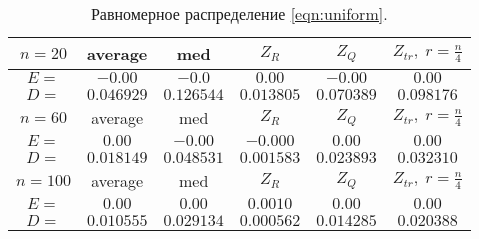 \documentclass[a4]{article}
\begin{document}
\begin{table}[H]
\caption{\label{tab:uniform} Равномерное распределение \eqref{eqn:uniform}.}
\begin{center}
\begin{tabular}{|c|c|c|c|c|c|}
\hline
$n = 20$  & average & med & $Z_R$ & $Z_Q$ & $Z_{tr},\;r=\frac{n}{4}$\\ \hline
$E =$       &	$-0.00$  & 	$-0.0$  & 	$0.00$    &	$-0.00$   &	$0.00$  \\ \hline  
$D =$       &	$0.046929$    &	$0.126544$    &	$0.013805$    &	$0.070389$   & 	$0.098176$    \\ \hline
					
$n = 60$  & average & med & $Z_R$ & $Z_Q$ & $Z_{tr},\;r=\frac{n}{4}$\\ \hline
$E =$       &	$0.00$   & 	$-0.00$   &	$-0.000$   &	$0.00$   & 	$0.00$    \\ \hline
$D =$       &	$0.018149$    &	$0.048531$   & 	$0.001583$    &	$0.023893$   & 	$0.032310$    \\ \hline
					
$n = 100$  & average & med & $Z_R$ & $Z_Q$ & $Z_{tr},\;r=\frac{n}{4}$\\ \hline
$E =$     &  	$0.00$    &	$0.00$    &	$0.0010 $  & 	$0.00$   & 	$0.00$    \\ \hline
$D =$    &   	$0.010555$    &	$0.029134$    &	$0.000562$   & 	$0.014285$   & 	$0.020388$    \\
\hline
\end{tabular}
\end{center}
\end{table}
\end{document}
